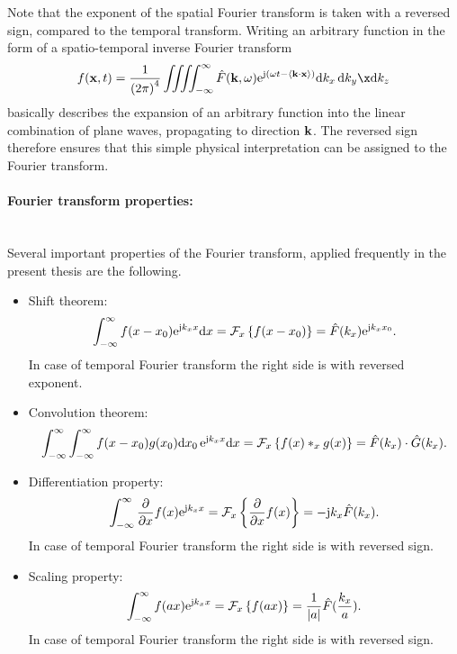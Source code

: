 Note that the exponent of the spatial Fourier transform is taken with a reversed sign, compared to the temporal transform.
Writing an arbitrary function in the form of a spatio-temporal inverse Fourier transform
\begin{equation}
f(\vx,t) = \frac{1}{\left( 2\pi \right)^4} \iiiint_ {-\infty}^{\infty} \hat{F}(\vk,\omega) \te^{ \ti \left( \omega t - \left< \vk \cdot \vx \right> \right)} \td k_x \, \td k_y \x \td k_z
\end{equation}
basically describes the expansion of an arbitrary function into the linear combination of plane waves, propagating to direction $\mathbf{k}$.
The reversed sign therefore ensures that this simple physical interpretation can be assigned to the Fourier transform.

\paragraph{Fourier transform properties:}\mbox{} \\
Several important properties of the Fourier transform, applied frequently in the present thesis are the following.
\begin{itemize}
\item Shift theorem:
\begin{equation}
\int_{-\infty}^{\infty} f(x-x_0) \mathrm{e}^{\mathrm{j} k_x x} \mathrm{d} x = \mathcal{F}_x \left\{ f(x-x_0) \right\} = \hat{F}(k_x) \mathrm{e}^{\mathrm{j} k_x x_0}.
\end{equation}
In case of temporal Fourier transform the right side is with reversed exponent.
\item Convolution theorem:
\begin{equation}
\int_{-\infty}^{\infty} \int_{-\infty}^{\infty} f(x-x_0) g(x_0) \mathrm{d} x_0 \, \mathrm{e}^{\mathrm{j} k_x x} \mathrm{d} x = \mathcal{F}_x \left\{ f(x) \ast_x g(x) \right\} = \hat{F}(k_x) \cdot \hat{G}(k_x).
\end{equation}
\item Differentiation property:
\begin{equation}
\int_{-\infty}^{\infty} \frac{\partial}{\partial x} f(x) \mathrm{e}^{\mathrm{j} k_x x} = \mathcal{F}_x \left\{ \frac{\partial}{\partial x} f(x) \right\} = 
-\mathrm{j} k_x \hat{F}(k_x).
\end{equation}
In case of temporal Fourier transform the right side is with reversed sign.
\item Scaling property:
\begin{equation}
\int_{-\infty}^{\infty} f(a x) \mathrm{e}^{\mathrm{j} k_x x} = \mathcal{F}_x \left\{ f( a x) \right\} = 
\frac{1}{|a|}\hat{F}(\frac{k_x}{a}).
\end{equation}
In case of temporal Fourier transform the right side is with reversed sign.
\end{itemize}

